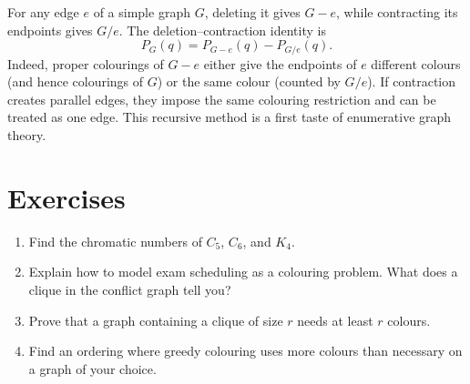 \Uni{} For any edge $e$ of a simple graph $G$, deleting it gives $G-e$, while contracting its endpoints gives $G/e$. The deletion--contraction identity is
\[
P_G(q)=P_{G-e}(q)-P_{G/e}(q).
\]
Indeed, proper colourings of $G-e$ either give the endpoints of $e$ different colours (and hence colourings of $G$) or the same colour (counted by $G/e$). If contraction creates parallel edges, they impose the same colouring restriction and can be treated as one edge. This recursive method is a first taste of enumerative graph theory.

\section*{Exercises}
\begin{enumerate}
\item Find the chromatic numbers of $C_5$, $C_6$, and $K_4$.
\item Explain how to model exam scheduling as a colouring problem. What does a clique in the conflict graph tell you?
\item Prove that a graph containing a clique of size $r$ needs at least $r$ colours.
\item Find an ordering where greedy colouring uses more colours than necessary on a graph of your choice.
\end{enumerate}

